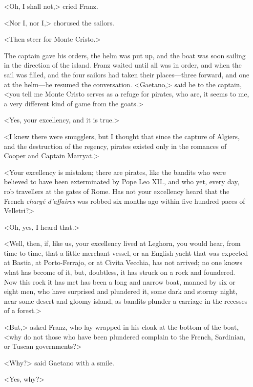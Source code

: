 <Oh, I shall not,> cried Franz. 

 <Nor I, nor I,> chorused the sailors. 

 <Then steer for Monte Cristo.> 

 The captain gave his orders, the helm was put up, and the boat was soon sailing in the direction of the island. Franz waited until all was in order, and when the sail was filled, and the four sailors had taken their places—three forward, and one at the helm—he resumed the conversation. <Gaetano,> said he to the captain, <you tell me Monte Cristo serves as a refuge for pirates, who are, it seems to me, a very different kind of game from the goats.> 

 <Yes, your excellency, and it is true.> 

 <I knew there were smugglers, but I thought that since the capture of Algiers, and the destruction of the regency, pirates existed only in the romances of Cooper and Captain Marryat.> 

 <Your excellency is mistaken; there are pirates, like the bandits who were believed to have been exterminated by Pope Leo XII., and who yet, every day, rob travellers at the gates of Rome. Has not your excellency heard that the French \textit{chargé d'affaires} was robbed six months ago within five hundred paces of Velletri?> 

 <Oh, yes, I heard that.> 

 <Well, then, if, like us, your excellency lived at Leghorn, you would hear, from time to time, that a little merchant vessel, or an English yacht that was expected at Bastia, at Porto-Ferrajo, or at Civita Vecchia, has not arrived; no one knows what has become of it, but, doubtless, it has struck on a rock and foundered. Now this rock it has met has been a long and narrow boat, manned by six or eight men, who have surprised and plundered it, some dark and stormy night, near some desert and gloomy island, as bandits plunder a carriage in the recesses of a forest.> 

 <But,> asked Franz, who lay wrapped in his cloak at the bottom of the boat, <why do not those who have been plundered complain to the French, Sardinian, or Tuscan governments?> 

 <Why?> said Gaetano with a smile. 

 <Yes, why?> 

